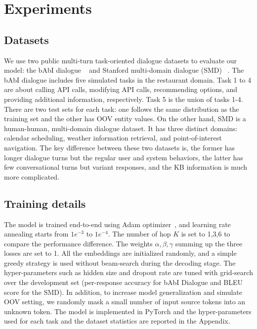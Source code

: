 \documentclass{article} \usepackage{iclr2019_conference,times}
\begin{document}
\section{Experiments}
\subsection{Datasets}
We use two public multi-turn task-oriented dialogue datasets to evaluate our model: the bAbI dialogue ~\citep{bordes2016learning} and Stanford multi-domain dialogue (SMD) ~\citep{ericKVR2017}. The bAbI dialogue includes five simulated tasks in the restaurant domain. Task 1 to 4 are about calling API calls, modifying API calls, recommending options, and providing additional information, respectively. Task 5 is the union of tasks 1-4. There are two test sets for each task: one follows the same distribution as the training set and the other has OOV entity values. On the other hand, SMD is a human-human, multi-domain dialogue dataset. It has three distinct domains: calendar scheduling, weather information retrieval, and point-of-interest navigation. The key difference between these two datasets is, the former has longer dialogue turns but the regular user and system behaviors, the latter has few conversational turns but variant responses, and the KB information is much more complicated. 

\subsection{Training details}
The model is trained end-to-end using Adam optimizer~\citep{KingmaB14}, and learning rate annealing starts from $1e^{-3}$ to $1e^{-4}$. The number of hop $K$ is set to 1,3,6 to compare the performance difference. The weights $\alpha, \beta, \gamma$ summing up the three losses are set to 1. All the embeddings are initialized randomly, and a simple greedy strategy is used without beam-search during the decoding stage. The hyper-parameters such as hidden size and dropout rate are tuned with grid-search over the development set (per-response accuracy for bAbI Dialogue and BLEU score for the SMD).  In addition, to increase model generalization and simulate OOV setting, we randomly mask a small number of input source tokens into an unknown token. The model is implemented in PyTorch and the hyper-parameters used for each task and the dataset statistics are reported in the Appendix.
\end{document}
